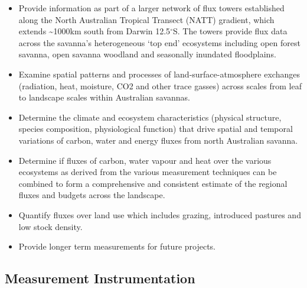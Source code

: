 \documentclass[11pt,a4paper]{article}
\begin{document}
\begin{itemize}
  \item Provide  information as part of a larger network of flux towers established along the  North Australian Tropical Transect (NATT) gradient, which extends \textasciitilde{}1000km  south from Darwin 12.5$^\circ$S.  The towers provide flux data across the savanna’s heterogeneous ‘top end’  ecosystems including open forest savanna, open savanna woodland and seasonally  inundated floodplains.
  \item Examine spatial patterns and processes of  land-surface-atmosphere exchanges (radiation, heat, moisture, CO2 and other  trace gasses) across scales from leaf to landscape scales within Australian  savannas.
  \item Determine  the climate and ecosystem characteristics (physical structure,  species composition, physiological function) that drive spatial and temporal variations of  carbon, water and energy fluxes from north Australian savanna.
  \item Determine if fluxes of carbon, water vapour and  heat over the various ecosystems as derived from the various measurement  techniques can be combined to form a comprehensive and consistent estimate of  the regional fluxes and budgets across the landscape.
  \item Quantify  fluxes over land use which includes grazing, introduced pastures and low stock  density.
  \item Provide  longer term measurements for future projects.
\end{itemize}

\subsection*{Measurement Instrumentation}
\end{document}
